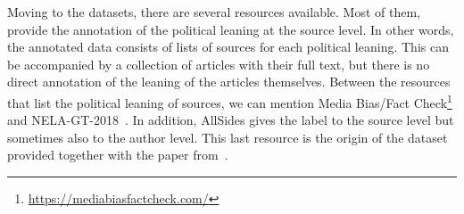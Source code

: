 Moving to the datasets, there are several resources available.
Most of them, provide the annotation of the political leaning at the source level. In other words, the annotated data consists of lists of sources for each political leaning. This can be accompanied by a collection of articles with their full text, but there is no direct annotation of the leaning of the articles themselves.
Between the resources that list the political leaning of sources, we can mention Media Bias/Fact Check\footnote{\url{https://mediabiasfactcheck.com/}} and NELA-GT-2018~\citep{DVN/ULHLCB_2019}.
In addition, AllSides gives the label to the source level but sometimes also to the author level. This last resource is the origin of the dataset provided together with the paper from~\citet{baly2020we}.





